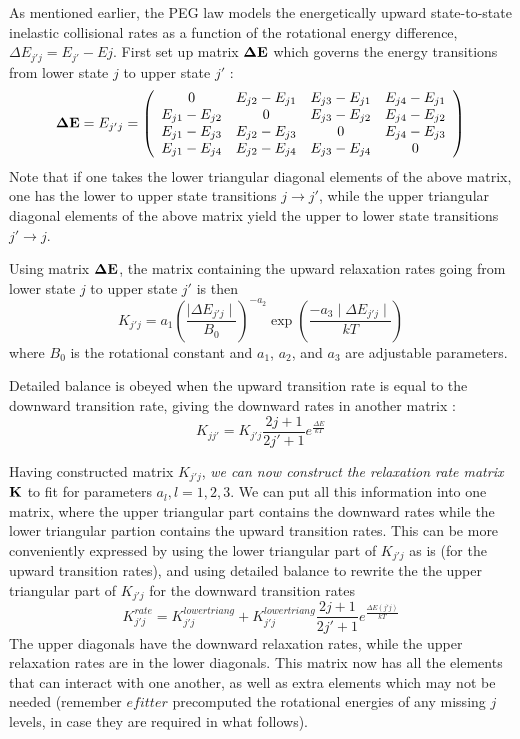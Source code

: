 \documentclass[11pt]{article}
\begin{document}
As mentioned earlier, the PEG law models the energetically upward 
state-to-state inelastic collisional rates as a function of the rotational 
energy difference, $\Delta E_{j'j} = E_{j'} - E{j}$.  First set up matrix 
${\bf \Delta E}$ which governs the energy transitions from lower state 
$j$ to upper state $j'$ :
\[
{\bf \Delta E} = {E_{j'j}} = 
\left(
\begin{array}{cccc} 
         0    & E_{j2}-E_{j1} & E_{j3}-E_{j1} & E_{j4}-E_{j1} \\
E_{j1}-E_{j2} & 0             & E_{j3}-E_{j2} & E_{j4}-E_{j2} \\
E_{j1}-E_{j3} &E_{j2}-E_{j3}  & 0             & E_{j4}-E_{j3} \\
E_{j1}-E_{j4} &E_{j2}-E_{j4}  & E_{j3}-E_{j4} & 0 
\end{array}\\
\right)
\]
Note that if one takes the lower triangular diagonal elements of the above
matrix, one has the lower to upper state transitions $j \rightarrow j'$, 
while the upper triangular diagonal elements of the above
matrix yield the upper to lower state transitions $j' \rightarrow j$. 

Using matrix ${\bf \Delta E}$, the matrix containing the upward relaxation 
rates going from lower state $j$ to upper state $j'$ is then
\[
 K_{j'j}=a_{1}\left(\frac{\mid\Delta E_{j'j}\mid}{B_{0}}\right)^{-a_{2}}
\exp\left(\frac{-a_{3}\mid\Delta E_{j'j}\mid}{kT}\right)
\]
where $B_{0}$ is the rotational constant and $a_{1}$, $a_{2}$, and $a_{3}$
are adjustable parameters. 

Detailed balance is obeyed when the upward transition rate is equal to the
downward transition rate, giving the downward rates in another matrix :
\[
K_{jj'}=K_{j'j} \frac{2j+1}{2j'+1} e^{\frac{\Delta E}{kT}}
\]

Having constructed matrix $K_{j'j}$, {\it we can now construct the 
relaxation rate matrix ${\bf K}$} to fit for parameters $a_{l}, l=1,2,3$. 
We can put all this information into one matrix, where the upper triangular 
part contains the downward rates while the lower triangular partion contains 
the upward transition rates. This can be more conveniently expressed by using
the lower triangular part of $K_{j'j}$ as is (for the upward transition 
rates), and using detailed balance to rewrite the the upper triangular part 
of $K_{j'j}$ for the downward transition rates
\[
K_{j'j}^{rate} = K_{j'j}^{lower triang} + 
      K_{j'j}^{lower triang} \frac{2j+1}{2j'+1} e^{\frac{\Delta E(j'j)}{kT}}
\]
The upper diagonals have the downward relaxation rates, while the upper 
relaxation rates are in the lower diagonals. This matrix now has all the 
elements that can interact with one another, as well as extra elements 
which may not be needed (remember $efitter$ precomputed the rotational 
energies of any missing $j$ levels, in case they are required in what 
follows).
\end{document}
